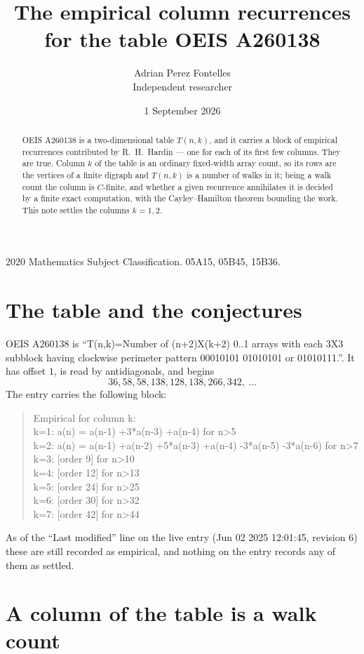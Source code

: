 \documentclass[11pt,a4paper]{article}
\title{The empirical column recurrences for the table OEIS A260138}
\author{Adrian Perez Fontelles\\ \small Independent researcher}
\date{1 September 2026}
\theoremstyle{plain}
\theoremstyle{definition}
\begin{document}
\maketitle

\begin{abstract}
OEIS A260138 is a two-dimensional table $T(n,k)$, and it carries a block of empirical
recurrences contributed by R.~H.~Hardin --- one for each of its first few columns. They are
true. Column $k$ of the table is an ordinary fixed-width array count, so its rows are the
vertices of a finite digraph and $T(n,k)$ is a number of walks in it; being a walk count the
column is $C$-finite, and whether a given recurrence annihilates it is decided by a finite
exact computation, with the Cayley--Hamilton theorem bounding the work. This note settles the columns $k=1, 2$.
\end{abstract}

\noindent\small 2020 Mathematics Subject Classification. 05A15, 05B45, 15B36.\normalsize

\section{The table and the conjectures}

OEIS A260138 is ``T(n,k)=Number of (n+2)X(k+2) 0..1 arrays with each 3X3 subblock having clockwise perimeter pattern 00010101 01010101 or 01010111.''. It has offset $1$, is
read by antidiagonals, and begins
\[
36, 58, 58, 138, 128, 138, 266, 342,\ \dots
\]
The entry carries the following block:
\begin{quote}\small
Empirical for column k:\\
k=1: a(n) = a(n-1) +3*a(n-3) +a(n-4) for n>5\\
k=2: a(n) = a(n-1) +a(n-2) +5*a(n-3) +a(n-4) -3*a(n-5) -3*a(n-6) for n>7\\
k=3: [order 9] for n>10\\
k=4: [order 12] for n>13\\
k=5: [order 24] for n>25\\
k=6: [order 30] for n>32\\
k=7: [order 42] for n>44\\
\end{quote}
As of the ``Last modified'' line on the live entry (Jun 02 2025 12:01:45, revision 6) these are still
recorded as empirical, and nothing on the entry records any of them as settled.

\section{A column of the table is a walk count}
\end{document}
